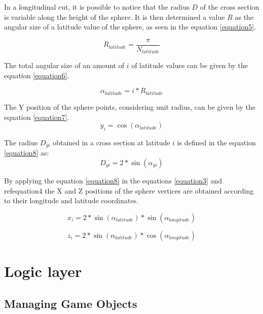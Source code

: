 \documentclass[runningheads]{llncs}
\begin{document}
In a longitudinal cut, it is possible to notice that the radius $D$ of the cross section is variable along the height of the sphere. It is then determined a value $R$ as the angular size of a latitude value of the sphere, as seen in the equation \ref{equation5}.

\begin{equation}
R_{latitude} = \frac{\pi}{ N_{latitude}}
\label{equation5}
\end{equation}

The total angular size of an amount of $i$ of latitude values can be given by the equation \ref{equation6}.

\begin{equation}
\alpha_{latitude} = i * R_{latitude}
\label{equation6}
\end{equation}

The Y position of the sphere points, considering unit radius, can be given by the equation \ref{equation7}.
\begin{equation}
y_{i} = \cos(\alpha_{latitude})
\label{equation7}
\end{equation}

The radius $D_{yi}$ obtained in a cross section at latitude $i$ is defined in the equation \ref{equation8} as:
\begin{equation}
D_{yi} = 2 * \sin(\alpha_{yi})
\label{equation8}
\end{equation}

By applying the equation \ref{equation8} in the equations \ref{equation3} and ref{equation4} the X and Z positions of the sphere vertices are obtained according to their longitude and latitude coordinates.

\begin{equation}
x_{i} = 2 * \sin(\alpha_{latitude}) * \sin(\alpha_{longitude})
\label{equation9}
\end{equation}

\begin{equation}
z_{i} = 2 * \sin(\alpha_{latitude}) * \cos(\alpha_{longitude})
\label{equation10}
\end{equation}

\section{Logic layer}

\subsection{Managing Game Objects}
\end{document}
